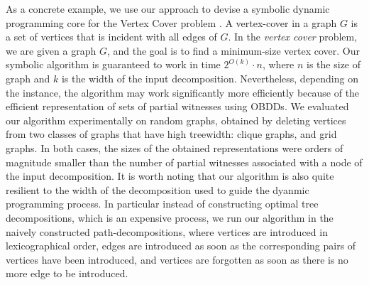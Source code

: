 As a concrete example, we use our approach to devise a symbolic dynamic programming core for the {\sc Vertex Cover} problem \cite{chen2024vertex,cai2017finding}. A vertex-cover in a graph $G$ is a set of vertices that is incident with all edges of $G$. In the {\em vertex cover} problem, we are given a graph $G$, and the goal is to find a minimum-size vertex cover. Our symbolic algorithm is guaranteed to work in time $2^{O(k)}\cdot n$, where $n$ is the size of graph and $k$ is the width of the input decomposition. Nevertheless, depending on the instance, the algorithm may work significantly more efficiently because of the efficient representation of sets of partial witnesses using OBDDs. We evaluated our algorithm experimentally on random graphs, obtained by deleting vertices from two classes of graphs that have high treewidth: clique graphs, and grid graphs. In both cases, the sizes of the obtained representations were orders of magnitude smaller than the number of partial witnesses associated with a node of the input decomposition. It is worth noting that our algorithm is also quite resilient to the width of the decomposition used to guide the dyanmic programming process. In particular instead of constructing optimal tree decompositions, which is an expensive process, we run our algorithm in the naively constructed path-decompositions, where vertices are introduced in lexicographical order, edges are introduced as soon as the corresponding pairs of vertices have been introduced, and vertices are forgotten as soon as there is no more edge to be introduced. 


\newcommand{\solutionWidth}{p}
\newcommand{\functionclassautomaton}{\mathcal{A}}
\newcommand{\detCalB}{\widehat{\mathcal{B}}}
\newcommand{\D}{D} 

